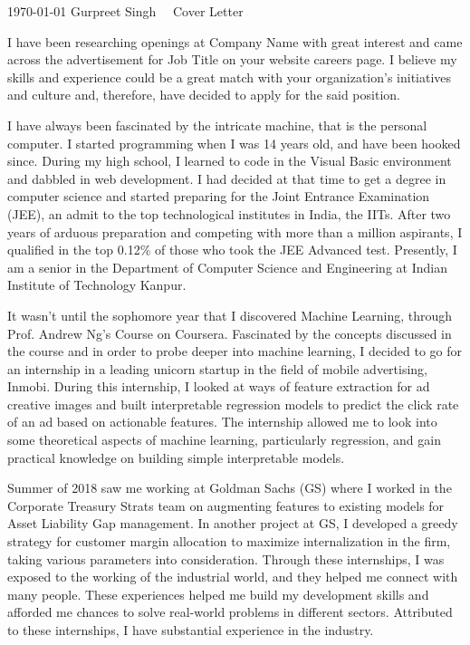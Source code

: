 \documentclass[11pt, letter]{resume}
\def\company{Company Name }
\def\profile{Job Title }
\begin{document}
\makecvheader[C]
\makecvfooter
  {\today}
  {Gurpreet Singh \ \cdotp \ Cover Letter}
  {}

\makelettertitle
\begin{cvletter}

	I have been researching openings at \company with great interest and came
	across the advertisement for \profile on your website careers page. I
	believe my skills and experience could be a great match with your
	organization’s initiatives and culture and, therefore, have decided to
	apply for the said position.

	I have always been fascinated by the intricate machine, that is the
	personal computer. I started programming when I was 14 years old, and have
	been hooked since. During my high school, I learned to code in the Visual
	Basic environment and dabbled in web development. I had decided at that
	time to get a degree in computer science and started preparing for the
	Joint Entrance Examination (JEE), an admit to the top technological
	institutes in India, the IITs. After two years of arduous preparation and
	competing with more than a million aspirants, I qualified in the top 0.12\%
	of those who took the JEE Advanced test. Presently, I am a senior in the
	Department of Computer Science and Engineering at Indian Institute of
	Technology Kanpur.

	It wasn’t until the sophomore year that I discovered Machine Learning,
	through Prof. Andrew Ng’s Course on Coursera. Fascinated by the concepts
	discussed in the course and in order to probe deeper into machine learning,
	I decided to go for an internship in a leading unicorn startup in the field
	of mobile advertising, Inmobi. During this internship, I looked at ways of
	feature extraction for ad creative images and built interpretable
	regression models to predict the click rate of an ad based on actionable
	features. The internship allowed me to look into some theoretical aspects
	of machine learning, particularly regression, and gain practical knowledge
	on building simple interpretable models.

	Summer of 2018 saw me working at Goldman Sachs (GS) where I worked in the
	Corporate Treasury Strats team on augmenting features to existing models
	for Asset Liability Gap management. In another project at GS, I developed a
	greedy strategy for customer margin allocation to maximize internalization
	in the firm, taking various parameters into consideration. Through these
	internships, I was exposed to the working of the industrial world, and they
	helped me connect with many people. These experiences helped me build my
	development skills and afforded me chances to solve real-world problems in
	different sectors. Attributed to these internships, I have substantial
	experience in the industry.


\end{cvletter}
\end{document}

